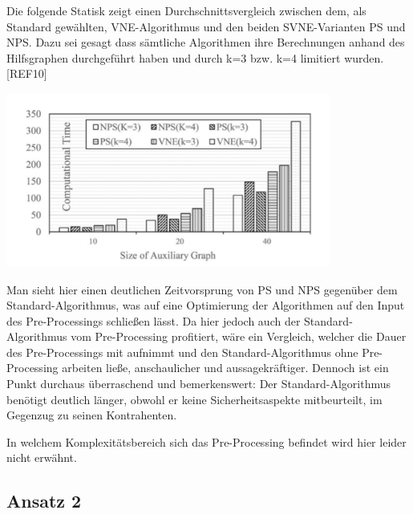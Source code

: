 \documentclass{lni}
\begin{document}
Die folgende Statisk zeigt einen Durchschnittsvergleich zwischen dem, als Standard gewählten, VNE-Algorithmus und den beiden SVNE-Varianten PS und NPS\cite{Std}. Dazu sei gesagt dass sämtliche Algorithmen ihre Berechnungen anhand des Hilfsgraphen durchgeführt haben und durch k=3 bzw. k=4 limitiert wurden.[REF10]\newline
\begin{center}
	\includegraphics[width=0.8\textwidth]{statistic.pdf}\newline
\end{center}
Man sieht  hier einen deutlichen Zeitvorsprung von PS und NPS gegenüber dem Standard-Algorithmus, was auf eine Optimierung der Algorithmen auf den Input des Pre-Processings schließen lässt. Da hier jedoch auch der Standard-Algorithmus vom Pre-Processing profitiert, wäre ein Vergleich, welcher die Dauer des Pre-Processings mit aufnimmt und den Standard-Algorithmus ohne Pre-Processing arbeiten ließe, anschaulicher und aussagekräftiger.
Dennoch ist ein Punkt durchaus überraschend und bemerkenswert: Der Standard-Algorithmus benötigt deutlich länger, obwohl er keine Sicherheitsaspekte mitbeurteilt, im Gegenzug zu seinen Kontrahenten.

In welchem Komplexitätsbereich sich das Pre-Processing befindet wird hier leider nicht erwähnt.


\subsection{Ansatz 2}
\end{document}
